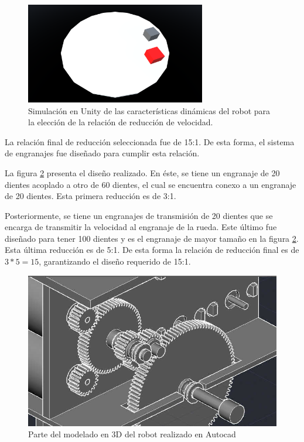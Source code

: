\begin{figure}[H]
	\centering
	\includegraphics[width=0.7\textwidth]{imagenes/prototipo/SimulacionUnity}
	\caption{Simulación en Unity de las características dinámicas del robot para la elección de la relación de reducción de velocidad.}
	\label{imagen:prototipo/SimulacionUnity}
\end{figure}

La relación final de reducción seleccionada fue de  15:1. De esta forma, el sistema de engranajes fue diseñado para cumplir esta relación.

La figura \ref{imagen:disenoEngranajesAutocad} presenta el diseño realizado. En éste, se tiene un engranaje de 20 dientes acoplado a otro de 60 dientes, el cual se encuentra conexo a un engranaje de 20 dientes. Esta primera reducción es de 3:1.

Posteriormente, se tiene un engranajes de transmisión de 20 dientes que se encarga de transmitir la velocidad al engranaje de la rueda. Este último fue diseñado para tener 100 dientes y es el engranaje de mayor tamaño en la figura \ref{imagen:disenoEngranajesAutocad}. Esta última reducción es de 5:1. De esta forma la relación de reducción final es de $3*5 = 15$, garantizando el diseño requerido de 15:1.

\begin{figure}[H]
	\centering
	\includegraphics[width=0.7\linewidth]{imagenes/prototipo/EngranajesAutocad}
	\caption{Parte del modelado en 3D del robot realizado en Autocad}
	\label{imagen:disenoEngranajesAutocad}
\end{figure}


